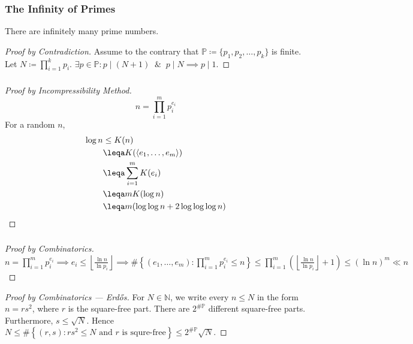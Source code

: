 \documentclass[UTF8,11pt,colorlinks,compress,openany]{beamer}%
\begin{document}
\begin{frame}\frametitle{The Infinity of Primes}
\begin{theorem}
There are infinitely many prime numbers.
\end{theorem}
\begin{proof}[Proof by Contradiction]
Assume to the contrary that $\mathbb{P}\coloneqq \{p_1,p_2,\dots,p_k\}$ is finite. Let $N\coloneqq \prod\limits_{i=1}^kp_i$.
$\exists p\in\mathbb{P}: p\mid(N+1)\;\;\&\;\;p\mid N\implies p\mid 1$.
\end{proof}
\end{frame}

\begin{frame}\frametitle{}
	\begin{proof}[Proof by Incompressibility Method]
		\[n=\prod\limits_{i=1}^m p_i^{e_i}\]
		For a random $n$,
		\begin{align*}
		\log n &\leq K(n)\\
		&\leqa K(\langle e_1,\ldots,e_m\rangle)\\
		&\leqa\sum\limits_{i=1}^m K(e_i)\\
		&\leqa mK(\log n)\\
		&\leqa m(\log\log n+2\log\log\log n)
		\end{align*}
	\end{proof}\vspace*{-.49\textwidth}
\end{frame}

\begin{frame}\frametitle{}
\begin{proof}[Proof by Combinatorics]
	$n=\prod\limits_{i=1}^m p_i^{e_i}\implies e_i\leq\left\lfloor\frac{\ln n}{\ln p_i}\right\rfloor\implies\#\left\{(e_1,\dots,e_m): \prod\limits_{i=1}^m p_i^{e_i}\leq n\right\}\leq \prod\limits_{i=1}^m\left(\left\lfloor\frac{\ln n}{\ln p_i}\right\rfloor+1\right)\leq (\ln n)^m\ll n$
\end{proof}
\begin{proof}[Proof by Combinatorics --- Erd\H{o}s]
For $N\in\mathbb{N}$, we write every $n\leq N$ in the form $n=rs^2$, where $r$ is the square-free part. There are $2^{\#\mathbb{P}}$ different square-free parts. Furthermore, $s\leq\sqrt{N}$. Hence $N\leq\#\left\{(r,s): rs^2\leq N \mbox{ and $r$ is squre-free}\right\}\leq 2^{\#\mathbb{P}}\sqrt{N}$.
\end{proof}
\end{frame}
\end{document}
